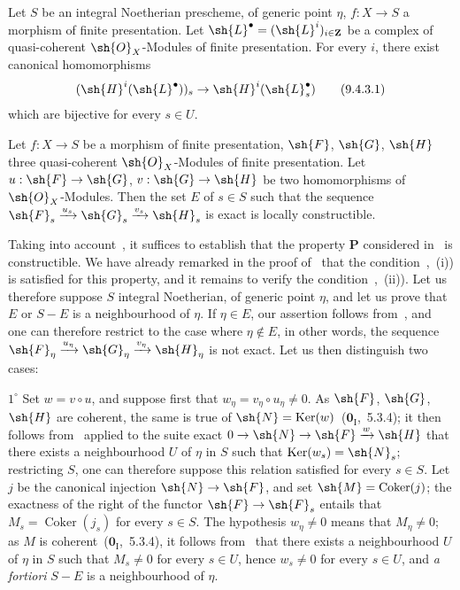 \begin{corollary}[9.4.3]
\label{IV.9.4.3}
Let $S$ be an integral Noetherian prescheme, of generic point $\eta$, $f:X\to S$ a morphism of finite presentation.
Let $\sh{L}^\bullet=(\sh{L}^i)_{i\in\mathbf{Z}}$ be a complex of quasi-coherent $\sh{O}_X$-Modules of finite presentation.
For every $i$, there exist canonical homomorphisms
\begin{equation}
  (\sh{H}^i(\sh{L}^\bullet))_s\to\sh{H}^i(\sh{L}^\bullet_s) \tag{9.4.3.1}
\end{equation}
which are bijective for every $s\in U$.
\end{corollary}

\begin{proposition}[9.4.4]
\label{IV.9.4.4}
Let $f:X\to S$ be a morphism of finite presentation, $\sh{F}$, $\sh{G}$, $\sh{H}$ three quasi-coherent $\sh{O}_X$-Modules of finite presentation.
Let $u:\sh{F}\to\sh{G}$, $v:\sh{G}\to\sh{H}$ be two homomorphisms of $\sh{O}_X$-Modules.
Then the set $E$ of $s\in S$ such that the sequence $\sh{F}_s\xrightarrow{u_s}\sh{G}_s\xrightarrow{v_s}\sh{H}_s$ is exact is locally constructible.
\end{proposition}

Taking into account~, it suffices to establish that the property $\mathbf{P}$ considered in~ is constructible.
We have already remarked in the proof of~ that the condition~,~(i)) is satisfied for this property, and it remains to verify the condition~,~(ii)).
Let us therefore suppose $S$ integral Noetherian, of generic point $\eta$, and let us prove that $E$ or $S-E$ is a neighbourhood of $\eta$.
If $\eta\in E$, our assertion follows from~, and one can therefore restrict to the case where $\eta\notin E$, in other words, the sequence $\sh{F}_\eta\xrightarrow{u_\eta}\sh{G}_\eta\xrightarrow{v_\eta}\sh{H}_\eta$ is not exact.
Let us then distinguish two cases:

$1^\circ$ Set $w=v\circ u$, and suppose first that $w_\eta=v_\eta\circ u_\eta\neq 0$.
As $\sh{F}$, $\sh{G}$, $\sh{H}$ are coherent, the same is true of $\sh{N}=\operatorname{Ker}(w)$~($\mathbf{0}_{\mathrm{I}}$,~5.3.4); it then follows from~ applied to the suite exact $0\to\sh{N}\to\sh{F}\xrightarrow{w}\sh{H}$ that there exists a neighbourhood $U$ of $\eta$ in $S$ such that $\operatorname{Ker}(w_s)=\sh{N}_s$; restricting $S$, one can therefore suppose this relation satisfied for every $s\in S$.
Let $j$ be the canonical injection $\sh{N}\to\sh{F}$, and set $\sh{M}=\operatorname{Coker}(j)$; the exactness of the right of the functor $\sh{F}\to\sh{F}_s$ entails that $M_s=\operatorname{Coker}(j_s)$ for every $s\in S$.
The hypothesis $w_\eta\neq 0$ means that $M_\eta\neq 0$; as $M$ is coherent~($\mathbf{0}_{\mathrm{I}}$,~5.3.4), it follows from~ that there exists a neighbourhood $U$ of $\eta$ in $S$ such that $M_s\neq 0$ for every $s\in U$, hence $w_s\neq 0$ for every $s\in U$, and \emph{a fortiori} $S-E$ is a neighbourhood of $\eta$.

